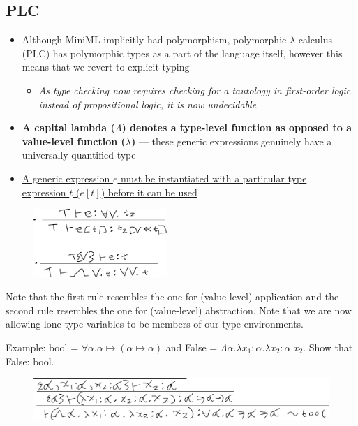 \documentclass[20pt,a4paper,landscape]{extarticle}
\begin{document}
\begin{flushleft}
\subsection{PLC}
\begin{itemize}
\item Although MiniML implicitly had polymorphism, polymorphic $\lambda$-calculus (PLC) has polymorphic types as a part of the language itself, however this means that we revert to explicit typing
    \begin{itemize}
    \item \textit{As type checking now requires checking for a tautology in first-order logic instead of propositional logic, it is now undecidable}
    \end{itemize}
\item \textbf{A capital lambda ($\Lambda$) denotes a type-level function as opposed to a value-level function ($\lambda$)} --- these generic expressions genuinely have a universally quantified type
\item \underline{A generic expression $e$ must be instantiated with a particular type}\\\underline{expression $t$ ($e[t]$) before it can be used}
\end{itemize}
\FloatBarrier
\begin{figure}[h]
\includegraphics[width=0.45\textwidth]{meta/cs349/PLC_TypingRules.pdf}{}
\end{figure}
\FloatBarrier
Note that the first rule resembles the one for (value-level) application and the second rule resembles the one for (value-level) abstraction. Note that we are now allowing lone type variables to be members of our type environments.

Example: bool = $\forall \alpha. \alpha \mapsto (\alpha \mapsto \alpha)$ and False = $\Lambda \alpha. \lambda x_1: \alpha. \lambda x_2: \alpha. x_2$. Show that False: bool.
\FloatBarrier
\begin{figure}[h]
\includegraphics[width=\textwidth]{meta/cs349/PLC_Example.pdf}{}
\end{figure}
\FloatBarrier

\end{flushleft}
\end{document}
